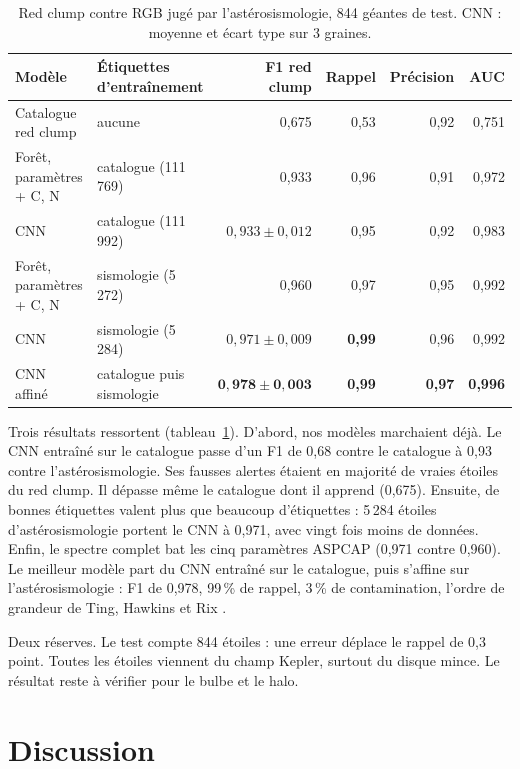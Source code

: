 \documentclass[11pt,a4paper]{article}
\begin{document}
\begin{table}[H]
\centering
\caption{Red clump contre RGB jugé par l'astérosismologie, 844 géantes de test. CNN : moyenne et écart type sur 3 graines.}
\label{tab:apokasc}
\small
\begin{tabular}{llrrrr}
\toprule
Modèle & Étiquettes d'entraînement & F1 red clump & Rappel & Précision & AUC \\
\midrule
Catalogue red clump & aucune & 0,675 & 0,53 & 0,92 & 0,751 \\
Forêt, paramètres + C, N & catalogue (111\,769) & 0,933 & 0,96 & 0,91 & 0,972 \\
CNN & catalogue (111\,992) & $0{,}933 \pm 0{,}012$ & 0,95 & 0,92 & 0,983 \\
Forêt, paramètres + C, N & sismologie (5\,272) & 0,960 & 0,97 & 0,95 & 0,992 \\
CNN & sismologie (5\,284) & $0{,}971 \pm 0{,}009$ & \textbf{0,99} & 0,96 & 0,992 \\
CNN affiné & catalogue puis sismologie & $\mathbf{0{,}978 \pm 0{,}003}$ & \textbf{0,99} & \textbf{0,97} & \textbf{0,996} \\
\bottomrule
\end{tabular}
\end{table}

Trois résultats ressortent (tableau~\ref{tab:apokasc}). D'abord, nos modèles marchaient déjà. Le CNN entraîné sur le catalogue passe d'un F1 de 0,68 contre le catalogue à 0,93 contre l'astérosismologie. Ses fausses alertes étaient en majorité de vraies étoiles du red clump. Il dépasse même le catalogue dont il apprend (0,675). Ensuite, de bonnes étiquettes valent plus que beaucoup d'étiquettes : 5\,284 étoiles d'astérosismologie portent le CNN à 0,971, avec vingt fois moins de données. Enfin, le spectre complet bat les cinq paramètres ASPCAP (0,971 contre 0,960). Le meilleur modèle part du CNN entraîné sur le catalogue, puis s'affine sur l'astérosismologie : F1 de 0,978, 99\,\% de rappel, 3\,\% de contamination, l'ordre de grandeur de Ting, Hawkins et Rix \cite{ting2018}.

Deux réserves. Le test compte 844 étoiles : une erreur déplace le rappel de 0,3 point. Toutes les étoiles viennent du champ Kepler, surtout du disque mince. Le résultat reste à vérifier pour le bulbe et le halo.

\section{Discussion}
\end{document}
